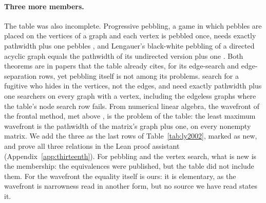\paragraph{Three more members.} The table was also incomplete. Progressive
pebbling, a game in which pebbles are placed on the vertices of a graph and
each vertex is pebbled once, needs exactly pathwidth plus one pebbles
\citep[Thm~3.1]{LY2002ref10}, and Lengauer's black-white pebbling of a
directed acyclic graph equals the pathwidth of its undirected version plus one
\citep[Thm~2]{LY2002ref14}. Both theorems are in papers that the table
already cites, for its edge-search and edge-separation rows, yet pebbling
itself is not among its problems. \citet[(5.1)]{BRST1991} search for a fugitive
who hides in the vertices, not the edges, and need exactly pathwidth plus one
searchers on every graph with a vertex, including the edgeless graphs where the
table's node search row fails. From numerical linear algebra, the wavefront of
the frontal method, met above \citep[\S2.1]{KumfertPothen1997}, is the problem
of the table: the least maximum wavefront is the pathwidth of the matrix's
graph plus one, on every nonempty matrix. We add the three as the last rows of
Table~\ref{tab:ly2002}, marked as new, and prove all three relations in the
Lean proof assistant (Appendix~\ref{app:thirteenth}). For pebbling and the
vertex search, what is new is the membership: the equivalences were published,
but the table did not include them. For the wavefront the equality itself is
ours: it is elementary, as the wavefront is narrowness read in another form,
but no source we have read states it.


